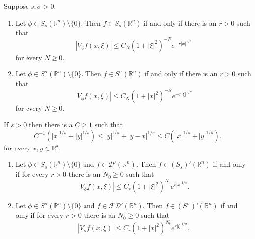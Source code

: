 \documentclass[10pt,a4paper]{amsart}
\begin{document}
\begin{thm}\label{thm:SsSTFT}
Suppose $s,\sigma> 0$.
\begin{enumerate}[label=(\roman*)]
    \item Let $\phi\in S_s(\mathbb{R}^n)\setminus\{0\}$. Then $f\in S_s(\mathbb{R}^n)$ if and only if there is an $r>0$ such that 
        \begin{equation}\label{eq:STFT3}
            |V_\phi f(x,\xi) | \leq C_N (1+|\xi|^2)^{-N} e^{- r |x|^{1/s}}
        \end{equation}
        for every $N\geq 0$.
     \item Let $\phi\in S^\sigma(\mathbb{R}^n)\setminus\{0\}$. Then $f\in S^\sigma(\mathbb{R}^n)$ if and only if there is an $r>0$ such that
        \begin{equation}\label{eq:STFT4}
            |V_{\phi} f(x,\xi) | \leq C_N (1+|x|^2)^{-N} e^{- r |\xi|^{1/\sigma}}
        \end{equation}
        for every $N\geq 0$.
\end{enumerate}
\end{thm}

\begin{lemma}\label{lem:absolutineq}
If $s>0$ then there is a $C \geq 1$ such that
\begin{equation}\label{eq:absolutineq}
    C^{-1} (|x|^{1/s} + |y|^{1/s} ) \leq |y|^{1/s} + |y-x|^{1/s} \leq C (|x|^{1/s} + |y|^{1/s} ).
\end{equation}
for every $x,y\in\mathbb{R}^n$.
\end{lemma}

\begin{thm}\label{thm:SsSTFTdual}
\begin{enumerate}[label=(\roman*)]
    \item Let $\phi\in S_s(\mathbb{R}^n)\setminus\{0\}$ and $f\in \mathscr{D}'(\mathbb{R}^n)$. Then $f\in(S_s)'(\mathbb{R}^n)$ if and only if for every $r>0$ there is an $N_0\geq 0$ such that
    \begin{equation}\label{eq:STFTdual1}
        |V_\phi f(x,\xi)| \leq C_{r}(1+|\xi|^2)^{N_0} e^{r|x|^{1/s}}.
    \end{equation}
     \item Let $\phi\in S^\sigma(\mathbb{R}^n)\setminus\{0\}$ and $f\in \mathscr{F}\mathscr{D}'(\mathbb{R}^n)$. Then $f\in(S^\sigma)'(\mathbb{R}^n)$ if and only if for every $r>0$ there is an $N_0\geq 0$ such that
    \begin{equation}\label{eq:STFTdual2}
        |V_\phi f(x,\xi)| \leq C_{r}(1+|x|^2)^{N_0} e^{r|\xi|^{1/\sigma}}.
    \end{equation}
\end{enumerate}
\end{thm}
\end{document}
